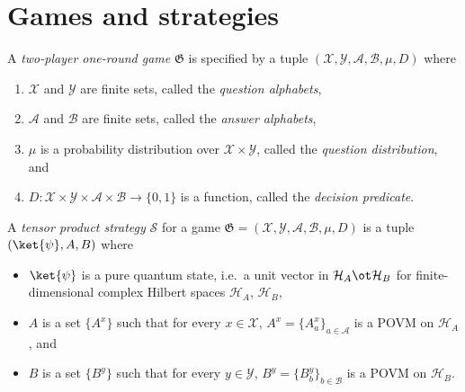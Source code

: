 \section{Games and strategies}
\label{sec:strat}

\begin{definition}\label{def:game}
	\leanok
	A \emph{two-player one-round game} $\mathfrak G$ is specified by a tuple $(\mathcal X, \mathcal Y, \mathcal A, \mathcal B, \mu, D)$ where
	\begin{enumerate}
		\item $\mathcal X$ and $\mathcal Y$ are finite sets, called the \emph{question alphabets},
		\item $\mathcal A$ and $\mathcal B$ are finite sets, called the \emph{answer alphabets},
		\item $\mu$ is a probability distribution over $\mathcal X \times \mathcal Y$, called the \emph{question distribution}, and
		\item $D \colon \mathcal X \times \mathcal Y \times \mathcal A \times \mathcal B \to \{0,1\}$ is a function, called the \emph{decision predicate}.
	\end{enumerate}
\end{definition}

\begin{definition}\label{def:tensor-product-strategy}
	\leanok
	A \emph{tensor product strategy} $\mathcal S$ for a game $\mathfrak G = (\mathcal X, \mathcal Y, \mathcal A, \mathcal B, \mu, D)$ is a tuple $(\ket{\psi}, A, B)$ where
	\begin{itemize}
		\item $\ket{\psi}$ is a pure quantum state, i.e.\ a unit vector in $\mathcal H_A \ot \mathcal H_B$ for finite-dimensional complex Hilbert spaces $\mathcal H_A$, $\mathcal H_B$,
		\item $A$ is a set $\{A^x\}$ such that for every $x \in \mathcal X$, $A^x = \{A^x_a\}_{a \in \mathcal A}$ is a POVM on $\mathcal H_A$, and
		\item $B$ is a set $\{B^y\}$ such that for every $y \in \mathcal Y$, $B^y = \{B^y_b\}_{b \in \mathcal B}$ is a POVM on $\mathcal H_B$.
	\end{itemize}
\end{definition}

